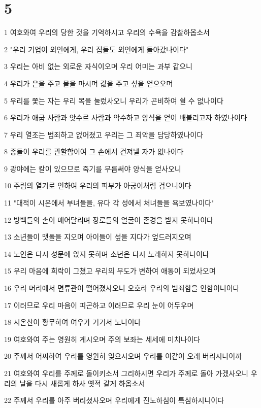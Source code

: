 \chapter{5}

\par 1 여호와여 우리의 당한 것을 기억하시고 우리의 수욕을 감찰하옵소서
\par 2 "우리 기업이 외인에게, 우리 집들도 외인에게 돌아갔나이다"
\par 3 우리는 아비 없는 외로운 자식이오며 우리 어미는 과부 같으니
\par 4 우리가 은을 주고 물을 마시며 값을 주고 섶을 얻으오며
\par 5 우리를 쫓는 자는 우리 목을 눌렀사오니 우리가 곤비하여 쉴 수 없나이다
\par 6 우리가 애굽 사람과 앗수르 사람과 악수하고 양식을 얻어 배불리고자 하였나이다
\par 7 우리 열조는 범죄하고 없어졌고 우리는 그 죄악을 담당하였나이다
\par 8 종들이 우리를 관할함이여 그 손에서 건져낼 자가 없나이다
\par 9 광야에는 칼이 있으므로 죽기를 무릅써야 양식을 얻사오니
\par 10 주림의 열기로 인하여 우리의 피부가 아궁이처럼 검으니이다
\par 11 "대적이 시온에서 부녀들을, 유다 각 성에서 처녀들을 욕보였나이다"
\par 12 방백들의 손이 매어달리며 장로들의 얼굴이 존경을 받지 못하나이다
\par 13 소년들이 맷돌을 지오며 아이들이 섶을 지다가 엎드러지오며
\par 14 노인은 다시 성문에 앉지 못하며 소년은 다시 노래하지 못하나이다
\par 15 우리 마음에 희락이 그쳤고 우리의 무도가 변하여 애통이 되었사오며
\par 16 우리 머리에서 면류관이 떨어졌사오니 오호라 우리의 범죄함을 인함이니이다
\par 17 이러므로 우리 마음이 피곤하고 이러므로 우리 눈이 어두우며
\par 18 시온산이 황무하여 여우가 거기서 노나이다
\par 19 여호와여 주는 영원히 계시오며 주의 보좌는 세세에 미치나이다
\par 20 주께서 어찌하여 우리를 영원히 잊으시오며 우리를 이같이 오래 버리시나이까
\par 21 여호와여 우리를 주께로 돌이키소서 그리하시면 우리가 주께로 돌아 가겠사오니 우리의 날을 다시 새롭게 하사 옛적 같게 하옵소서
\par 22 주께서 우리를 아주 버리셨사오며 우리에게 진노하심이 특심하시니이다


